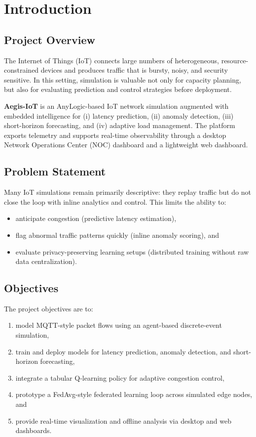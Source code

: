 \chapter{Introduction}

\section{Project Overview}

The Internet of Things (IoT) connects large numbers of heterogeneous, resource-constrained devices and produces traffic that is bursty, noisy, and security sensitive. In this setting, simulation is valuable not only for capacity planning, but also for evaluating prediction and control strategies before deployment.

\textbf{Aegis-IoT} is an AnyLogic-based IoT network simulation augmented with embedded intelligence for (i) latency prediction, (ii) anomaly detection, (iii) short-horizon forecasting, and (iv) adaptive load management. The platform exports telemetry and supports real-time observability through a desktop Network Operations Center (NOC) dashboard and a lightweight web dashboard.

\section{Problem Statement}

Many IoT simulations remain primarily descriptive: they replay traffic but do not close the loop with inline analytics and control. This limits the ability to:
\begin{itemize}
    \item anticipate congestion (predictive latency estimation),
    \item flag abnormal traffic patterns quickly (inline anomaly scoring), and
    \item evaluate privacy-preserving learning setups (distributed training without raw data centralization).
\end{itemize}

\section{Objectives}

The project objectives are to:
\begin{enumerate}
    \item model MQTT-style packet flows using an agent-based discrete-event simulation,
    \item train and deploy models for latency prediction, anomaly detection, and short-horizon forecasting,
    \item integrate a tabular Q-learning policy for adaptive congestion control,
    \item prototype a FedAvg-style federated learning loop across simulated edge nodes, and
    \item provide real-time visualization and offline analysis via desktop and web dashboards.
\end{enumerate}

